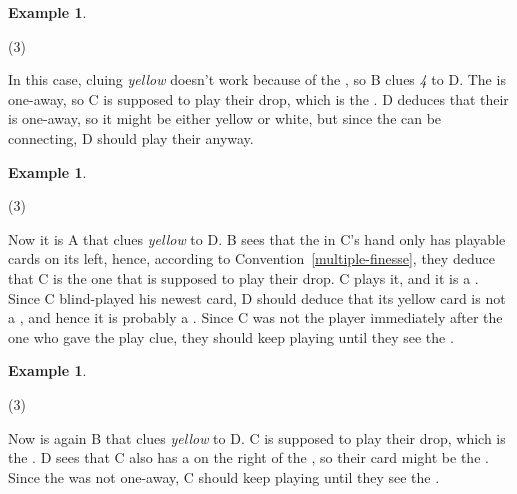 \documentclass[a4paper]{article}
\theoremstyle{plain}
\theoremstyle{definition}
\newtheorem{example}[theorem]{Example}
\begin{document}
\begin{example}
	\hfill
	\begin{tasks}(3)
		\task[+]      
		\task[A]    
		\task[B]    
		\task[C]    
		\task[D]    
		\task[E]    
	\end{tasks}
	
	In this case, cluing \textit{yellow} doesn't work because of the , so B clues \textit{4} to D. The  is one-away, so C is supposed to play their drop, which is the . D deduces that their  is one-away, so it might be either yellow or white, but since the  can be connecting, D should play their  anyway.
\end{example}

\begin{example}
	\hfill
	\begin{tasks}(3)
		\task[+]      
		\task[A]    
		\task[B]    
		\task[C]    
		\task[D]    
		\task[E]    
	\end{tasks}
	
	Now it is A that clues \textit{yellow} to D. B sees that the  in C's hand only has playable cards on its left, hence, according to Convention~\ref{multiple-finesse}, they deduce that C is the one that is supposed to play their drop. C plays it, and it is a . Since C blind-played his newest card, D should deduce that its yellow card is not a , and hence it is probably a . Since C was not the player immediately after the one who gave the play clue, they should keep playing until they see the .
\end{example}

\begin{example}
	\hfill
	\begin{tasks}(3)
		\task[+]      
		\task[A]    
		\task[B]    
		\task[C]    
		\task[D]    
		\task[E]    
	\end{tasks}
	
	Now is again B that clues \textit{yellow} to D. C is supposed to play their drop, which is the . D sees that C also has a  on the right of the , so their card might be the . Since the  was not one-away, C should keep playing until they see the .
\end{example}
\end{document}
